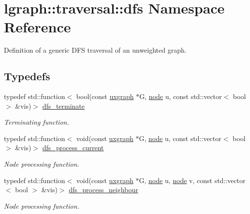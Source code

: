 \hypertarget{namespacelgraph_1_1traversal_1_1dfs}{}\section{lgraph\+:\+:traversal\+:\+:dfs Namespace Reference}
\label{namespacelgraph_1_1traversal_1_1dfs}


Definition of a generic D\+FS traversal of an unweighted graph.  


\subsection*{Typedefs}
\begin{DoxyCompactItemize}
\item 
typedef std\+::function$<$ bool(const \hyperlink{classlgraph_1_1uxgraph}{uxgraph} $\ast$G, \hyperlink{namespacelgraph_a397169dd66adf725210a30fb7251773e}{node} u, const std\+::vector$<$ bool $>$ \&vis)$>$ \hyperlink{namespacelgraph_1_1traversal_1_1dfs_a1c5d35982c40d91ec2f9f06d341b30f0}{dfs\+\_\+terminate}
\begin{DoxyCompactList}\small\item\em Terminating function. \end{DoxyCompactList}\item 
typedef std\+::function$<$ void(const \hyperlink{classlgraph_1_1uxgraph}{uxgraph} $\ast$G, \hyperlink{namespacelgraph_a397169dd66adf725210a30fb7251773e}{node} u, const std\+::vector$<$ bool $>$ \&vis)$>$ \hyperlink{namespacelgraph_1_1traversal_1_1dfs_a6e812ea9069ebb1e7e72776874825f0f}{dfs\+\_\+process\+\_\+current}
\begin{DoxyCompactList}\small\item\em Node processing function. \end{DoxyCompactList}\item 
typedef std\+::function$<$ void(const \hyperlink{classlgraph_1_1uxgraph}{uxgraph} $\ast$G, \hyperlink{namespacelgraph_a397169dd66adf725210a30fb7251773e}{node} u, \hyperlink{namespacelgraph_a397169dd66adf725210a30fb7251773e}{node} v, const std\+::vector$<$ bool $>$ \&vis)$>$ \hyperlink{namespacelgraph_1_1traversal_1_1dfs_ab56faeb9b70dd2449b91f404baf6a829}{dfs\+\_\+process\+\_\+neighbour}
\begin{DoxyCompactList}\small\item\em Node processing function. \end{DoxyCompactList}\end{DoxyCompactItemize}
